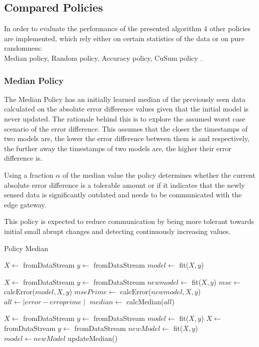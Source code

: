 \documentclass{mpaper}
\begin{document}
\subsection{Compared Policies}

In order to evaluate the performance of the presented algorithm 4 other policies are implemented, which rely either on certain statistics of the data or on pure randomness:\\
Median policy, Random policy, Accuracy policy, CuSum policy \cite{cusum_pierre}.

\subsubsection{Median Policy}

The Median Policy has an initially learned median of the previously seen data calculated on the absolute error difference values given that the initial model is never updated. 
The rationale behind this is to explore the assumed worst case scenario of the error difference. This assumes that the closer the timestamps of two models are, the lower the error difference between them is and respectively, the further away the timestamps of two models are, the higher their error difference is.

Using a fraction $\alpha$ of the median value the policy determines whether the current absolute error difference is a tolerable amount or if it indicates that the newly sensed data is significantly outdated and needs to be communicated with the edge gateway.

This policy is expected to reduce communication by being more tolerant towards initial small abrupt changes and detecting continuously increasing values.

\begin{algorithm}[h]
\caption{Policy Median}\label{polM}
\begin{algorithmic}
    \State $X \gets$ fromDataStream
    \State $y \gets$ fromDataStream
    \State $model \gets$ fit($X,y$)
    
        \State $X \gets$ fromDataStream
        \State $y \gets$ fromDataStream
        \State $newmodel \gets$ fit($X,y$)
        \State $mse \gets$ calcError($model,X,y$)
        \State $msePrime \gets$ calcError($newmodel,X,y$)
        \State $all \gets \mid error - erroprime \mid$
    \EndFor
    \State $median \gets$ calcMedian($all$)
\EndProcedure

\State $X \gets$ fromDataStream
\State $y \gets$ fromDataStream
\State $model \gets$ fit($X,y$)
    \State $X \gets$ fromDataStream
    \State $y \gets$ fromDataStream
    \State $newModel \gets$ fit($X,y$)
        \State $model \gets newModel$ 
    \EndIf
        \State updateMedian()
    \EndIf
\EndWhile
\end{algorithmic}
\end{algorithm}
\end{document}
